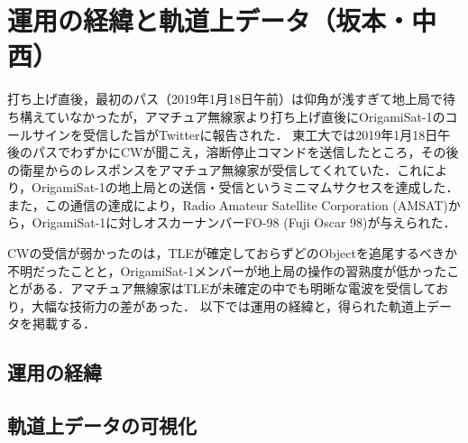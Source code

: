 \section{運用の経緯と軌道上データ（坂本・中西）}

打ち上げ直後，最初のパス（2019年1月18日午前）は仰角が浅すぎて地上局で待ち構えていなかったが，アマチュア無線家より打ち上げ直後にOrigamiSat-1のコールサインを受信した旨がTwitterに報告された．
東工大では2019年1月18日午後のパスでわずかにCWが聞こえ，溶断停止コマンドを送信したところ，その後の衛星からのレスポンスをアマチュア無線家が受信してくれていた．これにより，OrigamiSat-1の地上局との送信・受信というミニマムサクセスを達成した．また，この通信の達成により，Radio Amateur Satellite Corporation (AMSAT)から，OrigamiSat-1に対しオスカーナンバーFO-98 (Fuji Oscar 98)が与えられた．

CWの受信が弱かったのは，TLEが確定しておらずどのObjectを追尾するべきか不明だったことと，OrigamiSat-1メンバーが地上局の操作の習熟度が低かったことがある．アマチュア無線家はTLEが未確定の中でも明晰な電波を受信しており，大幅な技術力の差があった．
以下では運用の経緯と，得られた軌道上データを掲載する．

\subsection{運用の経緯}




\subsection{軌道上データの可視化}